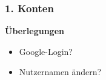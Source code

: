 \documentclass[aspectratio=1610]{beamer}
\begin{document}
	\begin{frame}[plain]
	\frametitle{1. Konten}
	\begin{minipage}{0.5\textwidth}
	\setlength{\fboxsep}{0pt}%
	\setlength{\fboxrule}{1pt}%
	\captionsetup{labelformat=empty}
	\centering
	\end{minipage}%
	\begin{minipage}{0.5\textwidth}
		\textbf{Überlegungen}
		\begin{itemize}
			\item<2->[--] Google-Login?
			\item<2->[--] Nutzernamen ändern?
		\end{itemize}
	\end{minipage}
	\end{frame}
\end{document}
